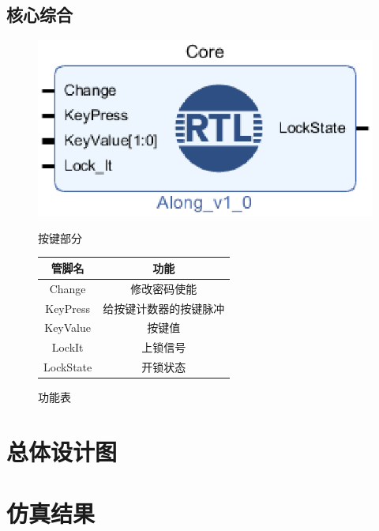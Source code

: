 \documentclass[a4paper,11pt]{ctexart}
\begin{document}
\subsection{核心综合}
\begin{figure}[htb]
  \begin{minipage}[b]{0.5\textwidth}
    \centering
    \includegraphics[width = \textwidth]{./images/AlongCore.eps}
    \caption{按键部分}
    \label{fig:by:table}
  \end{minipage}%
  \begin{minipage}[b]{0.5\textwidth}
    \centering
    \begin{tabular}{|c|c|} \hline
      管脚名 & 功能 \\ \hline\hline
      Change        &   修改密码使能                       \\
      KeyPress      &   给按键计数器的按键脉冲  \\
      KeyValue      &   按键值                                    \\
      LockIt       &   上锁信号                                \\
      LockState     &   开锁状态                                \\ \hline
    \end{tabular}
    \caption{功能表}
    \label{table:by:fig}
  \end{minipage}
\end{figure}


\section{总体设计图}


\section{仿真结果}
\end{document}
